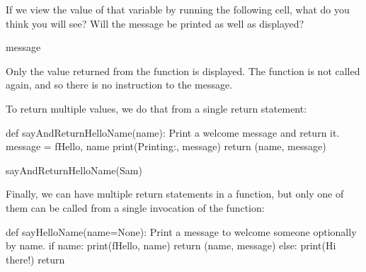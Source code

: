 \documentclass[letterpaper,10pt,english]{sphinxmanual}
\begin{document}
{If we view the value of that variable by running the following cell, what do you think you will see? Will the message be printed as well as displayed?


{
\begin{sphinxVerbatim}[commandchars=\\\{\}]
\llap{\color{nbsphinxin}[ ]:\,\hspace{\fboxrule}\hspace{\fboxsep}}message
\end{sphinxVerbatim}
}

Only the value returned from the function is displayed. The function is not called again, and so there is no instruction to  the message.

To return multiple values, we do that from a single return statement:

{
\begin{sphinxVerbatim}[commandchars=\\\{\}]
\llap{\color{nbsphinxin}[ ]:\,\hspace{\fboxrule}\hspace{\fboxsep}}def sayAndReturnHelloName(name):
    \PYGZdq{}\PYGZdq{}\PYGZdq{}Print a welcome message and return it.\PYGZdq{}\PYGZdq{}\PYGZdq{}
    message = f\PYGZdq{}Hello, \PYGZob{}name\PYGZcb{}\PYGZdq{}
    print(\PYGZdq{}Printing:\PYGZdq{}, message)
    return (name, message)

sayAndReturnHelloName(\PYGZsq{}Sam\PYGZsq{})
\end{sphinxVerbatim}
}

Finally, we can have multiple return statements in a function, but only one of them can be called from a single invocation of the function:

{
\begin{sphinxVerbatim}[commandchars=\\\{\}]
\llap{\color{nbsphinxin}[ ]:\,\hspace{\fboxrule}\hspace{\fboxsep}}def sayHelloName(name=None):
    \PYGZdq{}\PYGZdq{}\PYGZdq{}Print a message to welcome someone optionally by name.\PYGZdq{}\PYGZdq{}\PYGZdq{}
    if name:
        print(f\PYGZdq{}Hello, \PYGZob{}name\PYGZcb{}\PYGZdq{})
        return (name, message)
    else:
        print(\PYGZdq{}Hi there!\PYGZdq{})
    return


\end{sphinxVerbatim}}}
\end{document}
